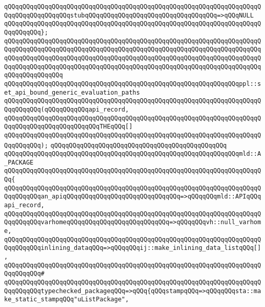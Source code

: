 \verb|qQQqqQQqqQQqqQQqqQQqqQQqqQQqqQQqqQQqqQQqqQQqqQQqqQQqqQQqqQQqqQQqqQQqqQQqqQQqqQQqqQQqqQQqstubqQQqqQQqqQQqqQQqqQQqqQQqqQQqqQQqqQQq=>qQQqNULL|\newline
\verb|qQQqqQQqqQQqqQQqqQQqqQQqqQQqqQQqqQQqqQQqqQQqqQQqqQQqqQQqqQQqqQQqqQQqqQQqqQQqqQQq};|\newline
\newline
\verb|qQQqqQQqqQQqqQQqqQQqqQQqqQQqqQQqqQQqqQQqqQQqqQQqqQQqqQQqqQQqqQQqqQQqqQQqqQQqqQQqqQQqqQQqqQQqqQQqqQQqqQQqqQQqqQQqqQQqqQQqqQQqqQQqqQQqqQQqqQQqqQQqqQQqqQQqqQQqqQQqqQQqqQQqqQQqqQQqqQQqqQQqqQQqqQQqqQQqqQQqqQQqqQQqqQQqqQQqqQQqqQQqqQQqqQQqqQQqqQQqqQQqqQQqqQQqqQQqqQQqqQQqqQQqqQQqqQQqqQQqqQQqqQQqqQQqqQQq|\newline
\verb|qQQqqQQqqQQqqQQqqQQqqQQqqQQqqQQqqQQqqQQqqQQqqQQqqQQqqQQqqQQqqQQqppl::set_api_bound_generic_evaluation_paths|\newline
\verb|qQQqqQQqqQQqqQQqqQQqqQQqqQQqqQQqqQQqqQQqqQQqqQQqqQQqqQQqqQQqqQQqqQQqqQQqqQQqqQQq(qQQqqQQqqQQqapi_record,|\newline
\verb|qQQqqQQqqQQqqQQqqQQqqQQqqQQqqQQqqQQqqQQqqQQqqQQqqQQqqQQqqQQqqQQqqQQqqQQqqQQqqQQqqQQqqQQqqQQqqQQqTHEqQQq[]|\newline
\verb|qQQqqQQqqQQqqQQqqQQqqQQqqQQqqQQqqQQqqQQqqQQqqQQqqQQqqQQqqQQqqQQqqQQqqQQqqQQqqQQq);|\newline
\newline
\verb|qQQqqQQqqQQqqQQqqQQqqQQqqQQqqQQqqQQqqQQqqQQqqQQq|\newline
\verb|qQQqqQQqqQQqqQQqqQQqqQQqqQQqqQQqqQQqqQQqqQQqqQQqqQQqqQQqqQQqqQQqmld::A_PACKAGE|\newline
\verb|qQQqqQQqqQQqqQQqqQQqqQQqqQQqqQQqqQQqqQQqqQQqqQQqqQQqqQQqqQQqqQQqqQQqqQQq{|\newline
\verb|qQQqqQQqqQQqqQQqqQQqqQQqqQQqqQQqqQQqqQQqqQQqqQQqqQQqqQQqqQQqqQQqqQQqqQQqqQQqqQQqan_apiqQQqqQQqqQQqqQQqqQQqqQQqqQQqqQQq=>qQQqqQQqmld::APIqQQqapi_record,|\newline
\verb|qQQqqQQqqQQqqQQqqQQqqQQqqQQqqQQqqQQqqQQqqQQqqQQqqQQqqQQqqQQqqQQqqQQqqQQqqQQqqQQqvarhomeqQQqqQQqqQQqqQQqqQQqqQQqqQQq=>qQQqqQQqvh::null_varhome,|\newline
\verb|qQQqqQQqqQQqqQQqqQQqqQQqqQQqqQQqqQQqqQQqqQQqqQQqqQQqqQQqqQQqqQQqqQQqqQQqqQQqqQQqinlining_dataqQQq=>qQQqqQQqij::make_inlining_data_listqQQq[],|\newline
\verb|qQQqqQQqqQQqqQQqqQQqqQQqqQQqqQQqqQQqqQQqqQQqqQQqqQQqqQQqqQQqqQQqqQQqqQQqqQQqqQQq#|\newline
\verb|qQQqqQQqqQQqqQQqqQQqqQQqqQQqqQQqqQQqqQQqqQQqqQQqqQQqqQQqqQQqqQQqqQQqqQQqqQQqqQQqtypechecked_packageqQQq=>qQQq{qQQqstampqQQq=>qQQqqQQqsta::make_static_stampqQQq"uListPackage",|\newline
